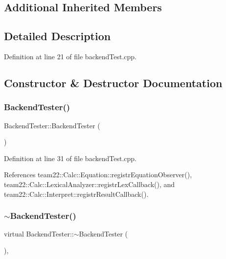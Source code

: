 \subsection*{Additional Inherited Members}


\subsection{Detailed Description}


Definition at line 21 of file backend\+Test.\+cpp.



\subsection{Constructor \& Destructor Documentation}
\mbox{\label{class_backend_tester_ad3927c00c9026acabc91277dce2b9980}} 
\subsubsection{\texorpdfstring{Backend\+Tester()}{BackendTester()}}
{\footnotesize\ttfamily Backend\+Tester\+::\+Backend\+Tester (\begin{DoxyParamCaption}{ }\end{DoxyParamCaption})\hspace{0.3cm}{\ttfamily [inline]}}



Definition at line 31 of file backend\+Test.\+cpp.



References team22\+::\+Calc\+::\+Equation\+::registr\+Equation\+Observer(), team22\+::\+Calc\+::\+Lexical\+Analyzer\+::registr\+Lex\+Callback(), and team22\+::\+Calc\+::\+Interpret\+::registr\+Result\+Callback().

\mbox{\label{class_backend_tester_a02c1da72606e5b3683b642564af9611d}} 
\subsubsection{\texorpdfstring{$\sim$\+Backend\+Tester()}{~BackendTester()}}
{\footnotesize\ttfamily virtual Backend\+Tester\+::$\sim$\+Backend\+Tester (\begin{DoxyParamCaption}{ }\end{DoxyParamCaption})\hspace{0.3cm}{\ttfamily [inline]}, {\ttfamily [virtual]}}



